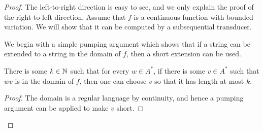 \begin{proof}
    The left-to-right direction is easy to see, and we only explain the proof of the right-to-left direction. Assume that $f$ is a continuous function with bounded variation. We will show that it can be computed by a subsequential transducer. 
 
    We begin with a simple pumping argument which shows that if a string can be extended to a string in the domain of $f$, then a short extension can be used.
   \begin{claim}\label{claim:bounded-extensions}
    There is some $k \in {\mathbb N}$ such that for every $w \in A^*$, if there is some $v \in A^*$ such that $wv$ is in the domain of $f$, then one can choose $v$ so that it has length at most $k$.
   \end{claim}
   \begin{proof}
    The domain is a regular language by continuity, and hence a pumping argument can be applied to make $v$ short.
   \end{proof}


\end{proof}
